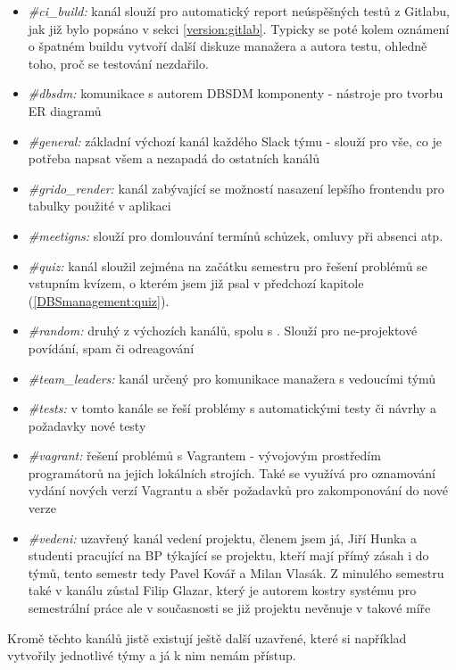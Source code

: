 \begin{itemize}
	\item \emph{\#ci\_build:} kanál slouží pro automatický report neúspěšných testů z Gitlabu, jak již bylo popsáno v sekci \ref{version:gitlab}. Typicky se poté kolem oznámení o špatném buildu vytvoří další diskuze manažera a autora testu, ohledně toho, proč se testování nezdařilo.
	\item \emph{\#dbsdm:} komunikace s autorem DBSDM komponenty - nástroje pro tvorbu ER diagramů \cite{fedor}
	\item \emph{\#general:} základní výchozí kanál každého Slack týmu - slouží pro vše, co je potřeba napsat všem a nezapadá do ostatních kanálů
	\item \emph{\#grido\_render:} kanál zabývající se možností nasazení lepšího frontendu pro tabulky použité v aplikaci
	\item \emph{\#meetigns:} slouží pro domlouvání termínů schůzek, omluvy při absenci atp.
	\item \emph{\#quiz:} kanál sloužil zejména na začátku semestru pro řešení problémů se vstupním kvízem, o kterém jsem již psal v předchozí kapitole (\ref{DBSmanagement:quiz}).
	\item \emph{\#random:} druhý z výchozích kanálů, spolu s . Slouží pro ne-projektové povídání, spam či odreagování
	\item \emph{\#team\_leaders:} kanál určený pro komunikace manažera s vedoucími týmů
	\item \emph{\#tests:} v tomto kanále se řeší problémy s automatickými testy či návrhy a požadavky nové testy
	\item \emph{\#vagrant:} řešení problémů s Vagrantem - vývojovým prostředím programátorů na jejich lokálních strojích. Také se využívá pro oznamování vydání nových verzí Vagrantu a sběr požadavků pro zakomponování do nové verze
	\item \emph{\#vedeni:} uzavřený kanál vedení projektu, členem jsem já, Jiří Hunka a studenti pracující na BP týkající se projektu, kteří mají přímý zásah i do týmů, tento semestr tedy Pavel Kovář a Milan Vlasák. Z minulého semestru také v kanálu zůstal Filip Glazar, který je autorem kostry systému pro semestrální práce ale v současnosti se již projektu nevěnuje v takové míře
\end{itemize}
Kromě těchto kanálů jistě existují ještě další uzavřené, které si například vytvořily jednotlivé týmy a já k nim nemám přístup.
